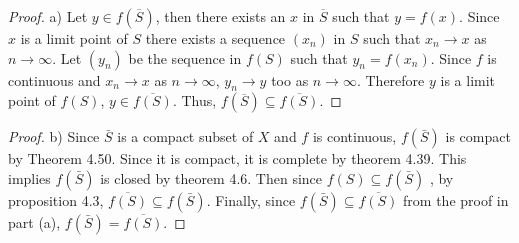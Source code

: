 \begin{questions}

\begin{solution}
  \begin{proof} a)
  Let $y\in f(\overline{S})$, then there exists an $x$ in $\overline{S}$ such that $y=f(x)$. Since $x$ is a limit point of $S$ there exists a sequence $(x_n)$ in $S$ such that $x_n\rightarrow x $ as $n\rightarrow \infty$. Let $(y_n)$ be the sequence in $f(S)$ such that $y_n=f(x_n)$. Since $f$ is continuous and $x_n\rightarrow x$ as $n\rightarrow\infty$, $y_n\rightarrow y$ too as $n\rightarrow\infty$. Therefore $y$ is a limit point of $f(S)$, $y\in \overline{f(S)}$. Thus, $f(\overline{S})\subseteq \overline{f(S)}$.
  \end{proof}
\end{solution}
\begin{solution}
  \begin{proof} b)
Since $\bar{S}$ is a compact subset of $X$ and $f$ is continuous, $f(\bar{S})$ is compact by Theorem 4.50. Since it is compact, it is complete by theorem 4.39. This implies $f(\bar{S})$ is closed by theorem 4.6. Then since $f(S) \subseteq f(\bar{S})$ , by proposition 4.3, $\overline{f(S)} \subseteq f(\bar{S})$. Finally, since $f(\bar{S}) \subseteq \overline{f(S)}$ from the proof in part (a), $f(\bar{S}) = \overline{f(S)}$.
  \end{proof}
\end{solution}

\end{questions}